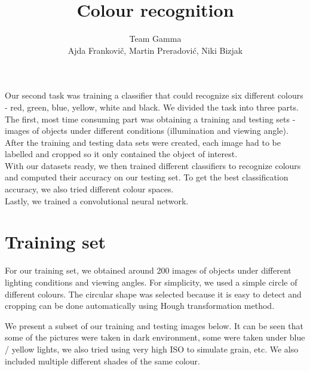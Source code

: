 \documentclass[12pt,a4paper]{article}
\author{Team Gamma \\ {\small Ajda Frankovič, Martin Preradović, Niki Bizjak}}
\title{Colour recognition}
\date{}
\begin{document}
	
	\maketitle
	
	Our second task was training a classifier that could recognize six different colours - red, green, blue, yellow, white and black. We divided the task into three parts.  \\
	
	The first, most time consuming part was obtaining a training and testing sets - images of objects under different conditions (illumination and viewing angle). After the training and testing data sets were created, each image had to be labelled and cropped so it only contained the object of interest. \\
	
	With our datasets ready, we then trained different classifiers to recognize colours and computed their accuracy on our testing set. To get the best classification accuracy, we also tried different colour spaces. \\
	
	Lastly, we trained a convolutional neural network.
		
	\section{Training set}
	
	For our training set, we obtained around 200 images of objects under different lighting conditions and viewing angles. For simplicity, we used a simple circle of different colours. The circular shape was selected because it is easy to detect and cropping can be done automatically using Hough transformation method.
	
	We present a subset of our training and testing images below. It can be seen that some of the pictures were taken in dark environment, some were taken under blue / yellow lights, we also tried using very high ISO to simulate grain, etc. We also included multiple different shades of the same colour.
\end{document}
